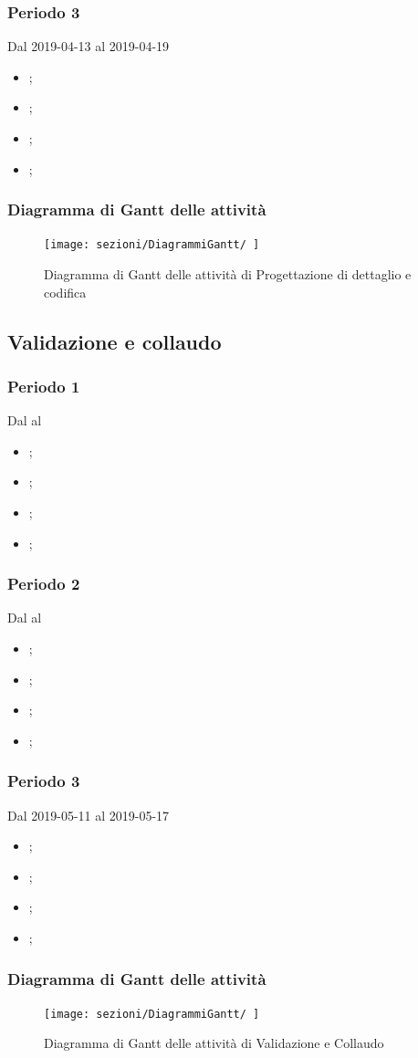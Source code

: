 \subsubsection{Periodo 3} 
Dal 2019-04-13 al 2019-04-19
\begin{itemize}
	\item \textbf{};
	\item \textbf{};
	\item \textbf{};
	\item \textbf{};
\end{itemize}
\subsubsection{Diagramma di Gantt delle attività}
\begin{figure}[h]
	\texttt{[image: sezioni/DiagrammiGantt/ ]}
	\caption{Diagramma di Gantt delle attività di Progettazione di dettaglio e codifica}
\end{figure}


\subsection{Validazione e collaudo}

\subsubsection{Periodo 1} 
Dal al
\begin{itemize}
	\item \textbf{};
	\item \textbf{};
	\item \textbf{};
	\item \textbf{};
\end{itemize}
\subsubsection{Periodo 2} 
Dal al
\begin{itemize}
	\item \textbf{};
	\item \textbf{};
	\item \textbf{};
	\item \textbf{};
\end{itemize}
\subsubsection{Periodo 3} 
Dal 2019-05-11 al 2019-05-17
\begin{itemize}
	\item \textbf{};
	\item \textbf{};
	\item \textbf{};
	\item \textbf{};
\end{itemize}
\subsubsection{Diagramma di Gantt delle attività}
\begin{figure}[h]
	\texttt{[image: sezioni/DiagrammiGantt/ ]}
	\caption{Diagramma di Gantt delle attività di Validazione e Collaudo}
\end{figure}
